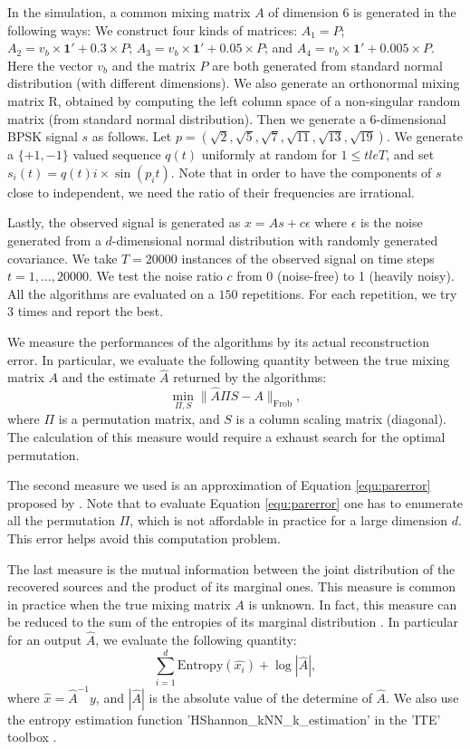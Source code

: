 \documentclass{article}
\theoremstyle{definition}
\begin{document}
In the simulation, a common mixing matrix $A$ of dimension 6 is generated in the following ways:
We construct four kinds of matrices:
$A_1 = P$; 
$A_2 = v_b\times\boldsymbol{1}' + 0.3\times P$;
$A_3 = v_b\times\boldsymbol{1}' + 0.05\times P$;
and $A_4 = v_b\times\boldsymbol{1}' + 0.005\times P$.
Here the vector $v_b$ and the matrix $P$ are both generated from standard normal distribution (with different dimensions).
We also generate an orthonormal mixing matrix R, obtained by computing the left column space of a non-singular random matrix (from standard normal distribution).  
Then we generate a $6$-dimensional BPSK signal $s$ as follows. Let $p=(\sqrt{2},\sqrt{5},\sqrt{7},\sqrt{11},\sqrt{13},\sqrt{19})$.
We generate a $\{+1,-1\}$ valued sequence $q(t)$ uniformly at random for $1 \le t le T$, and set
$s_i(t) = q(t) i\times\sin (p_i t)$.
Note that in order to have the components of $s$ close to independent, we need the ratio of their frequencies are irrational. 

Lastly, the observed signal is generated as $x = As+c\epsilon$ where $\epsilon$ is the noise generated from a $d$-dimensional normal distribution with randomly generated covariance. 
We take $T=20000$ instances of the observed signal on time steps $t= 1,\ldots, 20000$.
We test the noise ratio $c$ from 0 (noise-free) to 1 (heavily noisy). 
All the algorithms are evaluated on a $150$ repetitions. For each repetition, we try $3$ times and report the best.

We measure the performances of the algorithms by its actual reconstruction error.
In particular, we evaluate the following quantity between the true mixing matrix $A$ and the estimate $\hat{A}$ returned by the algorithms:
\begin{equation}
\label{equ:parerror}
\min_{\Pi,S} \|\hat{A}\Pi S - A\|_{\text{Frob}},
\end{equation}
where $\Pi$ is a permutation matrix, and $S$ is a column scaling matrix (diagonal).
The calculation of this measure would require a exhaust search for the optimal permutation.

The second measure we used is an approximation of Equation \eqref{equ:parerror} proposed by \citet{comon1994independent}. 
Note that to evaluate Equation \eqref{equ:parerror} one has to enumerate all the permutation $\Pi$, which is not affordable in practice for a large dimension $d$. 
This error helps avoid this computation problem. 

The last measure is the mutual information between the joint distribution of the recovered sources and the product of its marginal ones. 
This measure is common in practice when the true mixing matrix $A$ is unknown. 
In fact, this measure can be reduced to the sum of the entropies of its marginal distribution \citep{Learned-Miller:2003:IUS:945365.964306}. 
In particular for an output $\hat{A}$, we evaluate the following quantity:
\begin{equation}
\sum_{i = 1}^{d} \text{Entropy}(\hat{x_i}) + \log |\hat{A}|,
\end{equation}
where $\hat{x} = \hat{A}^{-1}y$, and $|\hat{A}|$ is the absolute value of the determine of $\hat{A}$. We also use the entropy estimation function 'HShannon\_kNN\_k\_estimation' in the 'ITE' toolbox \citep{szabo14information}. 
\fi
\end{document}
